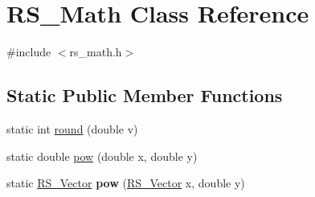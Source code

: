 \hypertarget{classRS__Math}{\section{R\-S\-\_\-\-Math Class Reference}
\label{classRS__Math}
}


{\ttfamily \#include $<$rs\-\_\-math.\-h$>$}

\subsection*{Static Public Member Functions}
\begin{DoxyCompactItemize}
\item 
static int \hyperlink{classRS__Math_ae9283dad7f5bf90453943cbe2fc031ad}{round} (double v)
\item 
static double \hyperlink{classRS__Math_a277ee6bb63fcd7fe31e2b3c7f6243a56}{pow} (double x, double y)
\item 
\hypertarget{classRS__Math_a45b2a17df87f27cda973dccb0786bdb1}{static \hyperlink{classRS__Vector}{R\-S\-\_\-\-Vector} {\bfseries pow} (\hyperlink{classRS__Vector}{R\-S\-\_\-\-Vector} x, double y)}\label{classRS__Math_a45b2a17df87f27cda973dccb0786bdb1}


\end{DoxyCompactItemize}
